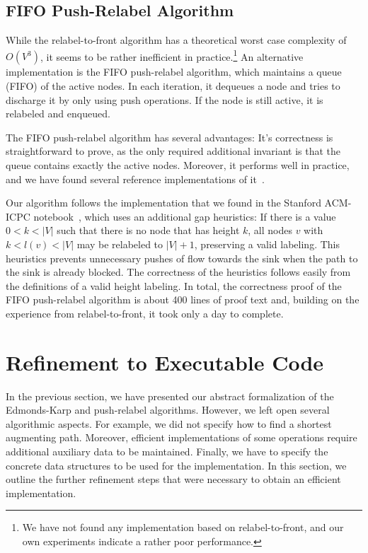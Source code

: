 \documentclass[smallcondensed]{svjour3}     %
\begin{document}
\subsection{FIFO Push-Relabel Algorithm}
While the relabel-to-front algorithm has a theoretical worst case complexity of $O(V^3)$, it seems to be rather inefficient in practice.\footnote{We have not found any implementation based on relabel-to-front, and our own experiments indicate a rather poor performance.}
An alternative implementation is the FIFO push-relabel algorithm, which maintains a queue (FIFO) of the active nodes. 
In each iteration, it dequeues a node and tries to discharge it by only using push operations.
If the node is still active, it is relabeled and enqueued.


The FIFO push-relabel algorithm has several advantages: It's correctness is straightforward to prove, 
as the only required additional invariant is that the queue contains exactly the active nodes. 
Moreover, it performs well in practice, and we have found several reference implementations of it~\cite{Gold_Network_Opt,ICPC-notebook}.

Our algorithm follows the implementation that we found in the Stanford ACM-ICPC notebook~\cite{ICPC-notebook}, 
which uses an additional gap heuristics: If there is a value $0<k<|V|$ such that there is no node that has height $k$, 
all nodes $v$ with $k<l(v)<|V|$ may be relabeled to $|V|+1$, preserving a valid labeling. 
This heuristics prevents unnecessary pushes of flow towards the sink when the path to the sink is already blocked.
The correctness of the heuristics follows easily from the definitions of a valid height labeling.
In total, the correctness proof of the FIFO push-relabel algorithm is about 400 lines of proof text and, building on the experience from relabel-to-front, it 
took only a day to complete.

  
    
\section{Refinement to Executable Code}\label{sec:executable}
  In the previous section, we have presented our abstract formalization of the Edmonds-Karp and push-relabel algorithms.
  However, we left open several algorithmic aspects. For example, we did not specify how to find a shortest augmenting path.
  Moreover, efficient implementations of some operations require additional auxiliary data to be maintained. 
  Finally, we have to specify the concrete data structures to be used for the implementation. 
  In this section, we outline the further refinement steps that were necessary to obtain an efficient implementation.
\end{document}
